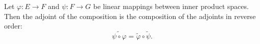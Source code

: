 Let $\varphi: E \rightarrow F$ and $\psi: F \rightarrow G$ be linear mappings between inner product spaces. Then the adjoint of the composition is the composition of the adjoints in reverse order:
$$\widetilde{\psi \circ \varphi} = \tilde{\varphi} \circ \tilde{\psi}.$$
